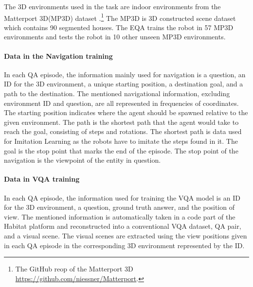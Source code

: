 The 3D environments used in the task are indoor environments from the Matterport 3D(MP3D) dataset \cite{eqa_matterport}.\footnote{ The GitHub reop of the Matterport 3D \url{https://github.com/niessner/Matterport}.} The MP3D is 3D constructed scene dataset which contains 90 segmented houses. The EQA trains the robot in 57 MP3D environments and tests the robot in 10 other unseen MP3D environments.  

\paragraph{Data in the Navigation training}

In each QA episode, the information mainly used for navigation is a question,  an ID for the 3D environment, a unique starting position, a destination goal, and a path to the destination. %
The mentioned navigational information, excluding environment ID and question,  are all represented in frequencies of coordinates. The starting position indicates where the agent should be spawned relative to the given environment.  The path is the shortest path that the agent would take to reach the goal, consisting of steps and rotations. The shortest path is data used for Imitation Learning as the robots have to imitate the steps found in it. The goal is the stop point that marks the end of the episode. The stop point of the navigation is the viewpoint of the entity in question. 

\paragraph{Data in VQA training}

In each QA episode, the information used for training the VQA model is an ID for the 3D environment, a question, ground truth answer, and the position of view. %
The mentioned information is automatically taken in a code part of the Habitat platform and reconstructed into a conventional  VQA dataset, QA pair, and a visual scene. The visual scenes are extracted using the view positions given in each QA episode in the corresponding 3D environment represented by the ID. 

